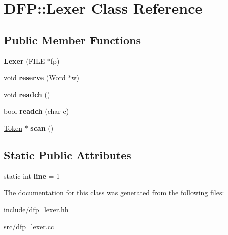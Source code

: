 \hypertarget{class_d_f_p_1_1_lexer}{}\section{D\+FP\+:\+:Lexer Class Reference}
\label{class_d_f_p_1_1_lexer}
\subsection*{Public Member Functions}
\begin{DoxyCompactItemize}
\item 
{\bfseries Lexer} (F\+I\+LE $\ast$fp)\hypertarget{class_d_f_p_1_1_lexer_a29f761e9983b95cb5c46dfe5c735c77f}{}\label{class_d_f_p_1_1_lexer_a29f761e9983b95cb5c46dfe5c735c77f}

\item 
void {\bfseries reserve} (\hyperlink{class_d_f_p_1_1_word}{Word} $\ast$w)\hypertarget{class_d_f_p_1_1_lexer_aedf6d8e7ced2f9eff243a2ef03667b37}{}\label{class_d_f_p_1_1_lexer_aedf6d8e7ced2f9eff243a2ef03667b37}

\item 
void {\bfseries readch} ()\hypertarget{class_d_f_p_1_1_lexer_ae2318f850f01d5e642a16df7a14bd9e2}{}\label{class_d_f_p_1_1_lexer_ae2318f850f01d5e642a16df7a14bd9e2}

\item 
bool {\bfseries readch} (char c)\hypertarget{class_d_f_p_1_1_lexer_aaa3f0b89cceceb8d78aed1edcd4054cb}{}\label{class_d_f_p_1_1_lexer_aaa3f0b89cceceb8d78aed1edcd4054cb}

\item 
\hyperlink{class_d_f_p_1_1_token}{Token} $\ast$ {\bfseries scan} ()\hypertarget{class_d_f_p_1_1_lexer_ac02a39a39813c137e75f5ea14b5cf937}{}\label{class_d_f_p_1_1_lexer_ac02a39a39813c137e75f5ea14b5cf937}

\end{DoxyCompactItemize}
\subsection*{Static Public Attributes}
\begin{DoxyCompactItemize}
\item 
static int {\bfseries line} = 1\hypertarget{class_d_f_p_1_1_lexer_a44746d995dbbcbd1cf3b1460d9aaf712}{}\label{class_d_f_p_1_1_lexer_a44746d995dbbcbd1cf3b1460d9aaf712}

\end{DoxyCompactItemize}


The documentation for this class was generated from the following files\+:\begin{DoxyCompactItemize}
\item 
include/dfp\+\_\+lexer.\+hh\item 
src/dfp\+\_\+lexer.\+cc\end{DoxyCompactItemize}
